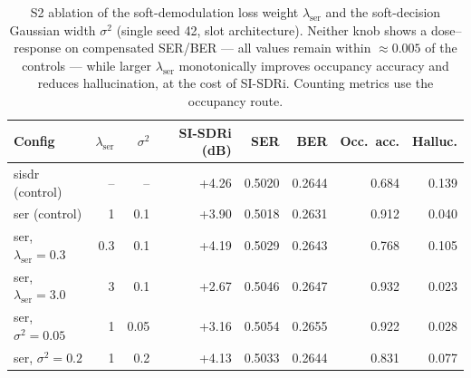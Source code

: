 \begin{table}[H]
\centering
\caption{S2 ablation of the soft-demodulation loss weight $\lambda_{\mathrm{ser}}$ and the soft-decision Gaussian width $\sigma^2$ (single seed 42, slot architecture). Neither knob shows a dose--response on compensated SER/BER --- all values remain within $\approx\!0.005$ of the controls --- while larger $\lambda_{\mathrm{ser}}$ monotonically improves occupancy accuracy and reduces hallucination, at the cost of SI-SDRi. Counting metrics use the occupancy route.}
\label{tab:s2_ablation}
\setlength{\tabcolsep}{3pt}
\footnotesize
\begin{tabular}{l r r r r r r r}
\toprule
Config & $\lambda_{\mathrm{ser}}$ & $\sigma^2$ & SI-SDRi (dB) & SER & BER & Occ.\ acc. & Halluc. \\
\midrule
sisdr (control) & -- & -- & +4.26 & 0.5020 & 0.2644 & 0.684 & 0.139 \\
ser (control) & 1 & 0.1 & +3.90 & 0.5018 & 0.2631 & 0.912 & 0.040 \\
ser, $\lambda_{\mathrm{ser}}{=}0.3$ & 0.3 & 0.1 & +4.19 & 0.5029 & 0.2643 & 0.768 & 0.105 \\
ser, $\lambda_{\mathrm{ser}}{=}3.0$ & 3 & 0.1 & +2.67 & 0.5046 & 0.2647 & 0.932 & 0.023 \\
ser, $\sigma^2{=}0.05$ & 1 & 0.05 & +3.16 & 0.5054 & 0.2655 & 0.922 & 0.028 \\
ser, $\sigma^2{=}0.2$ & 1 & 0.2 & +4.13 & 0.5033 & 0.2644 & 0.831 & 0.077 \\
\bottomrule
\end{tabular}
\end{table}
